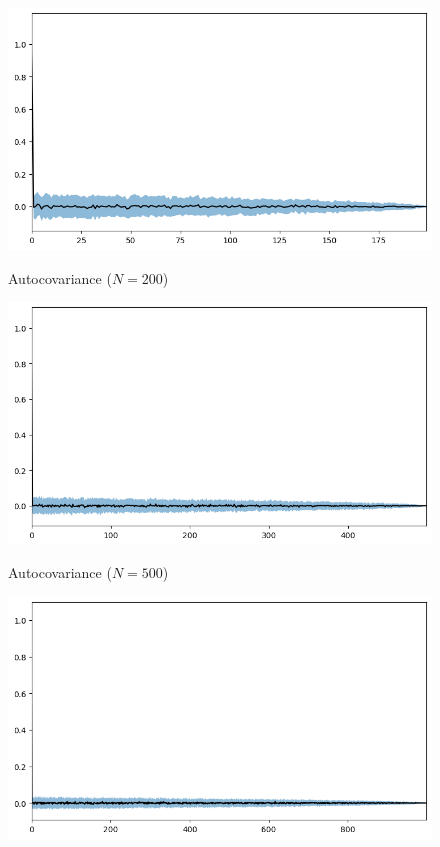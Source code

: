 \documentclass[11pt]{article}
\begin{document}
\begin{exercise}
\begin{figure}
    \centering
    \begin{minipage}[t]{0.3\textwidth}
    \centerline{\includegraphics[width=\textwidth]{img/autocorrelation_200.png}}
    \centerline{Autocovariance ($N=200$)}
    \end{minipage}
    \begin{minipage}[t]{0.3\textwidth}
    \centerline{\includegraphics[width=\textwidth]{img/autocorrelation_500.png}}
    \centerline{Autocovariance ($N=500$)}
    \end{minipage}
    \begin{minipage}[t]{0.3\textwidth}
    \centerline{\includegraphics[width=\textwidth]{img/autocorrelation_1000.png}}

\end{minipage}
\end{figure}
\end{exercise}
\end{document}
